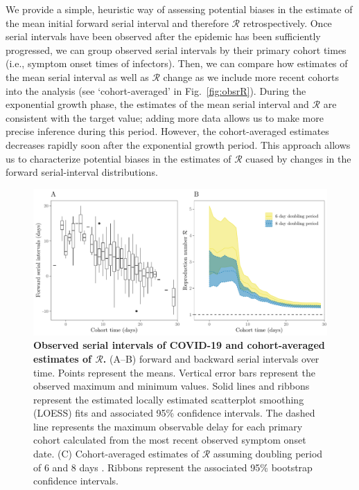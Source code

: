 \documentclass[12pt]{article}
\newcommand{\fref}[1]{Fig.~\ref{fig:#1}}
\begin{document}
We provide a simple, heuristic way of assessing potential biases in the estimate of the mean initial forward serial interval and therefore $\mathcal R$ retrospectively.
Once serial intervals have been observed after the epidemic has been sufficiently progressed, we can group observed serial intervals by their primary cohort times (i.e., symptom onset times of infectors).
Then, we can compare how estimates of the mean serial interval as well as $\mathcal R$ change as we include more recent cohorts into the analysis (see `cohort-averaged' in \fref{obsrR}).
During the exponential growth phase, the estimates of the mean serial interval and $\mathcal R$ are consistent with the target value;
adding more data allows us to make more precise inference during this period.
However, the cohort-averaged estimates decreases rapidly soon after the exponential growth period.
This approach allows us to characterize potential biases in the estimates of $\mathcal R$ cuased by changes in the forward serial-interval distributions.

\begin{figure}[!th]
\includegraphics[width=\textwidth]{serial_analysis.pdf}
\caption{
\textbf{Observed serial intervals of COVID-19 and cohort-averaged estimates of $\mathcal R$.}
(A--B) forward and backward serial intervals over time.
Points represent the means. Vertical error bars represent the observed maximum and minimum values.
Solid lines and ribbons represent the estimated locally estimated scatterplot smoothing (LOESS) fits and associated 95\% confidence intervals.
The dashed line represents the maximum observable delay for each primary cohort calculated from the most recent observed symptom onset date.
(C) Cohort-averaged estimates of $\mathcal R$ assuming doubling period of 6 and 8 days \citep{li2020early, wu2020nowcasting}.
Ribbons represent the associated 95\% bootstrap confidence intervals.
}
\label{fig:du}
\end{figure}
\end{document}
